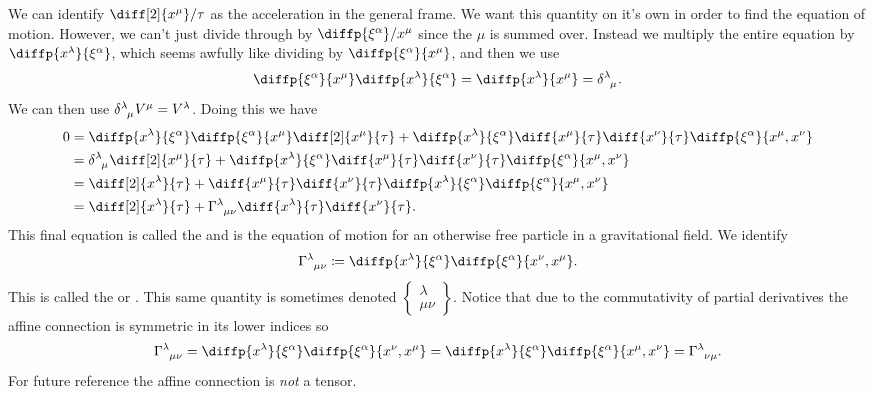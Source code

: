 \documentclass[fleqn]{NotesClass}
\newcommand*{\christoffel}[3]{\tensor{\Gamma}{^{#1}_{{#2}{#3}}}}
\begin{document}
    We can identify \(\diff[2]{x^\mu}/{\tau}\) as the acceleration in the general frame.
    We want this quantity on it's own in order to find the equation of motion.
    However, we can't just divide through by \(\diffp{\xi^\alpha}/{x^\mu}\) since the \(\mu\) is summed over.
    Instead we multiply the entire equation by \(\diffp{x^\lambda}{\xi^\alpha}\), which seems awfully like dividing by \(\diffp{\xi^\alpha}{x^\mu}\), and then we use
    \begin{equation}
        \diffp{\xi^\alpha}{x^\mu}\diffp{x^\lambda}{\xi^\alpha} = \diffp{x^\lambda}{x^\mu} = \tensor{\delta}{^\lambda_\mu}.
    \end{equation}
    We can then use \(\tensor{\delta}{^\lambda_\mu}V^\mu = V^\lambda\).
    Doing this we have
    \begin{align}
        0 &= \diffp{x^\lambda}{\xi^\alpha} \diffp{\xi^\alpha}{x^\mu}\diff[2]{x^\mu}{\tau} + \diffp{x^\lambda}{\xi^\alpha} \diff{x^\mu}{\tau} \diff{x^\nu}{\tau} \diffp{\xi^\alpha}{x^\mu, x^\nu} \\
        &= \tensor{\delta}{^\lambda_\mu} \diff[2]{x^\mu}{\tau} + \diffp{x^\lambda}{\xi^\alpha} \diff{x^\mu}{\tau} \diff{x^\nu}{\tau} \diffp{\xi^\alpha}{x^\mu, x^\nu} \\
        &= \diff[2]{x^\lambda}{\tau} + \diff{x^\mu}{\tau} \diff{x^\nu}{\tau} \diffp{x^\lambda}{\xi^\alpha} \diffp{\xi^\alpha}{x^\mu, x^\nu} \\
        &= \diff[2]{x^\lambda}{\tau} + \christoffel{\lambda}{\mu}{\nu} \diff{x^\lambda}{\tau} \diff{x^\nu}{\tau}.
    \end{align}
    This final equation is called the  and is the equation of motion for an otherwise free particle in a gravitational field.
    We identify
    \begin{equation}\label{eqn:affine connection}
        \christoffel{\lambda}{\mu}{\nu} \coloneqq \diffp{x^\lambda}{\xi^\alpha}\diffp{\xi^\alpha}{x^\nu, x^\mu}.
    \end{equation}
    This is called the \index{\(\christoffel{\lambda}{\mu}{\nu}\), affine connection} or .
    This same quantity is sometimes denoted \(\left\{\begin{smallmatrix} \lambda\\ \mu\nu \end{smallmatrix}\right\}\).
    Notice that due to the commutativity of partial derivatives the affine connection is symmetric in its lower indices so
    \begin{equation}
        \christoffel{\lambda}{\mu}{\nu} = \diffp{x^\lambda}{\xi^\alpha} \diffp{\xi^\alpha}{x^\nu, x^\mu} = \diffp{x^\lambda}{\xi^\alpha} \diffp{\xi^\alpha}{x^\mu, x^\nu} = \christoffel{\lambda}{\nu}{\mu}.
    \end{equation}
    For future reference the affine connection is \emph{not} a tensor.
    
\end{document}
